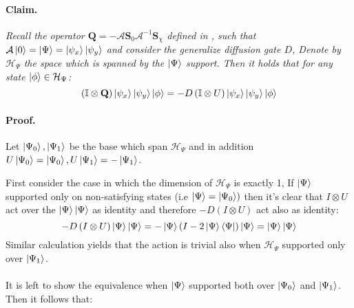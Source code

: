 \documentclass{article}
\begin{document}
\begin{multicols}{2}
\paragraph{Claim.} \textit{ Recall the operator $\mathbf Q  = - {\mathcal A}  {\mathbf S}_0 
  {\mathcal A}^{-1}  {\mathbf S}_\chi$ defined in \cite{Brassard_2002}, such that $ \mathcal A \ket{0} = \ket{\Psi} = \ket{\psi_{x}}\ket{\psi_{y}}$ and 
consider the generalize diffusion gate $D$, Denote by $\mathcal{H}_{\Psi}$ the space which is spanned by the $\ket{\Psi}$ support. Then it holds that for any state $ \ket{\phi} \in \mathcal{H}_{\Psi} $:}
\begin{equation*}
  \left(  \mathbb{I} \otimes \mathbf Q \right) \ket{\psi_{x}}\ket{\psi_{y}} \ket{\phi} =  - D \left( \mathbb{I} \otimes U \right)  \ket{\psi_{x}}\ket{\psi_{y}} \ket{\phi} 
\end{equation*}

\paragraph{Proof.} Let $\ket{\Psi_0}, \ket{\Psi_1}$ be the base which span $ \mathcal{H}_{\Psi}$ and in addition $U\ket{\Psi_0} = \ket{\Psi_0}, U\ket{\Psi_1} =- \ket{\Psi_1}$.

First consider the case in which the dimension of $ \mathcal{H}_{\Psi}$ is exactly 1, If $ \ket{\Psi} $ supported only on non-satisfying states (i.e $\ket{\Psi} = \ket{\Psi_{0}}) $ then it's clear that $ I \otimes U $ act over the $ \ket{\Psi}\ket{\Psi} $ as identity and therefore $ -D\left( I \otimes U \right) $ act also as identity: 
\begin{equation*}
  -D\left( I \otimes U \right) \ket{\Psi}\ket{\Psi} = -\ket{\Psi}\left( I - 2\ket{\Psi}\bra{\Psi}  \right) \ket{\Psi} = \ket{\Psi}\ket{\Psi}
\end{equation*}
Similar calculation yields that the action is trivial also when  $ \mathcal{H}_{\Psi}$  supported only over $ \ket{\Psi_1} $.  

\paragraph{}

It is left to show the equivalence when $\ket{\Psi}$ supported both over $\ket{\Psi_0}$ and $\ket{\Psi_1}$. Then it follows that:


\end{multicols}
\end{document}
